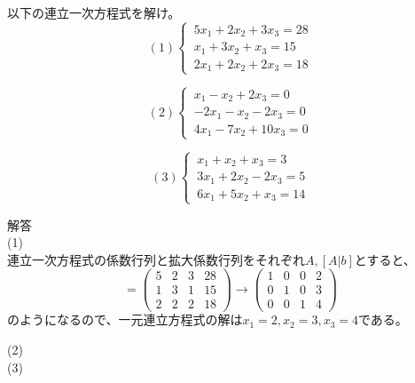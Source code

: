 \documentclass{jlreq}
\begin{document}
\begin{problem}
  以下の連立一次方程式を解け。
  \begin{equation*}
    (1)  \left\{ \,
    \begin{aligned}
      5x_1 + 2x_2 + 3 x_3 = 28 \\
      x_1 + 3 x_2 + x_3 = 15 \\
      2x_1 + 2x_2 + 2 x_3 = 18
    \end{aligned}
\right.
  \end{equation*}

  \begin{equation*}
    (2) \left\{ \,
    \begin{aligned}
      x_1 - x_2 + 2 x_3 = 0 \\
      -2x_1 - x_2 - 2 x_3 = 0 \\
      4x_1 - 7x_2 + 10 x_3 = 0
    \end{aligned}
\right.
  \end{equation*}

  \begin{equation*}
    (3) \left\{ \,
    \begin{aligned}
      x_1 + x_2 + x_3 = 3 \\
      3 x_1 + 2 x_2 - 2 x_3 = 5 \\
      6 x_1 + 5 x_2 + x_3 = 14
    \end{aligned}
\right.
  \end{equation*}
  \dotfill

  解答 \\
  (1) \\
  連立一次方程式の係数行列と拡大係数行列をそれぞれ$A, [A|b]$とすると、
  \begin{equation*}
    [A|b] = \begin{pmatrix}
      5 & 2 & 3 & 28 \\
      1 & 3 & 1 & 15 \\
      2 & 2 & 2 & 18
    \end{pmatrix} \to \begin{pmatrix}
      1 & 0 & 0 & 2 \\
      0 & 1 & 0 & 3 \\
      0 & 0 & 1 & 4
    \end{pmatrix}
  \end{equation*}
  のようになるので、一元連立方程式の解は$x_1 = 2, x_2 = 3, x_3 = 4$である。

  (2) \\

  (3) \\
\end{problem}
\end{document}
